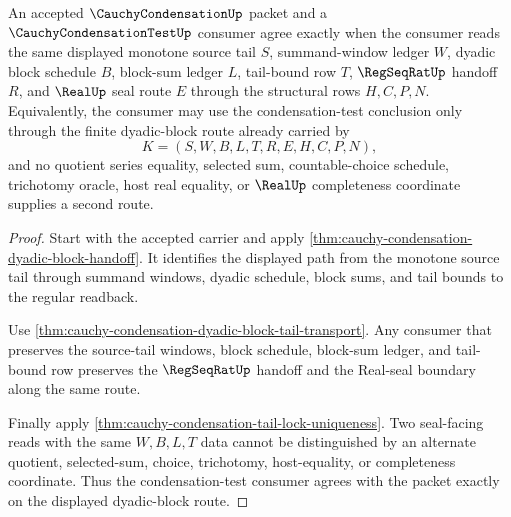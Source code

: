 \begin{theorem}
\label{thm:cauchy-condensation-test-dyadic-block-equivalence}
An accepted $\CauchyCondensationUp$ packet and a $\CauchyCondensationTestUp$ consumer agree exactly when the consumer reads the same displayed monotone source tail $S$, summand-window ledger $W$, dyadic block schedule $B$, block-sum ledger $L$, tail-bound row $T$, $\RegSeqRatUp$ handoff $R$, and $\RealUp$ seal route $E$ through the structural rows $H,C,P,N$. Equivalently, the consumer may use the condensation-test conclusion only through the finite dyadic-block route already carried by
$$
K=(S,W,B,L,T,R,E,H,C,P,N),
$$
and no quotient series equality, selected sum, countable-choice schedule, trichotomy oracle, host real equality, or $\RealUp$ completeness coordinate supplies a second route.
\end{theorem}
\begin{proof}
Start with the accepted carrier and apply \autoref{thm:cauchy-condensation-dyadic-block-handoff}. It identifies the displayed path from the monotone source tail through summand windows, dyadic schedule, block sums, and tail bounds to the regular readback.

Use \autoref{thm:cauchy-condensation-dyadic-block-tail-transport}. Any consumer that preserves the source-tail windows, block schedule, block-sum ledger, and tail-bound row preserves the $\RegSeqRatUp$ handoff and the Real-seal boundary along the same route.

Finally apply \autoref{thm:cauchy-condensation-tail-lock-uniqueness}. Two seal-facing reads with the same $W,B,L,T$ data cannot be distinguished by an alternate quotient, selected-sum, choice, trichotomy, host-equality, or completeness coordinate. Thus the condensation-test consumer agrees with the packet exactly on the displayed dyadic-block route.
\end{proof}

